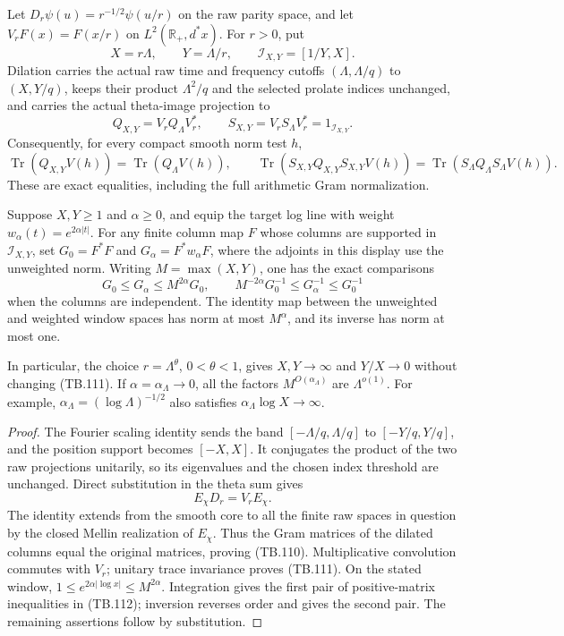 \begin{proposition}
Let \(D_r\psi(u)=r^{-1/2}\psi(u/r)\) on the raw parity
space, and let \(V_rF(x)=F(x/r)\) on
\(L^2(\mathbb R_+,d^*x)\).
For \(r>0\), put
\[
 X=r\Lambda,\qquad Y=\Lambda/r,\qquad
 \mathcal I_{X,Y}=[1/Y,X].
 \tag{TB.109}
\]
Dilation carries the actual raw time and frequency cutoffs
\((\Lambda,\Lambda/q)\) to \((X,Y/q)\), keeps their product
\(\Lambda^2/q\) and the selected prolate indices unchanged,
and carries the actual theta-image projection to
\[
 Q_{X,Y}=V_rQ_\Lambda V_r^*,\qquad
 S_{X,Y}=V_rS_\Lambda V_r^*
          =1_{\mathcal I_{X,Y}}.
 \tag{TB.110}
\]
Consequently, for every compact smooth norm test \(h\),
\[
 \operatorname{Tr}(Q_{X,Y}V(h))
       =\operatorname{Tr}(Q_\Lambda V(h)),\qquad
 \operatorname{Tr}(S_{X,Y}Q_{X,Y}S_{X,Y}V(h))
       =\operatorname{Tr}(S_\Lambda Q_\Lambda S_\Lambda V(h)).
 \tag{TB.111}
\]
These are exact equalities, including the full arithmetic
Gram normalization.

Suppose \(X,Y\geq1\) and \(\alpha\geq0\), and equip the target log line with
weight \(w_\alpha(t)=e^{2\alpha|t|}\).
For any finite column map \(F\) whose columns are supported
in \(\mathcal I_{X,Y}\), set
\(G_0=F^*F\) and \(G_\alpha=F^*w_\alpha F\), where the
adjoints in this display use the unweighted norm.
Writing \(M=\max(X,Y)\), one has the exact comparisons
\[
 G_0\leq G_\alpha\leq M^{2\alpha}G_0,\qquad
 M^{-2\alpha}G_0^{-1}\leq G_\alpha^{-1}\leq G_0^{-1}
 \tag{TB.112}
\]
when the columns are independent.
The identity map between the unweighted and weighted
window spaces has norm at most \(M^\alpha\), and its
inverse has norm at most one.

In particular, the choice \(r=\Lambda^\theta\),
\(0<\theta<1\), gives \(X,Y\to\infty\) and \(Y/X\to0\)
without changing (TB.111).
If \(\alpha=\alpha_\Lambda\to0\), all the factors
\(M^{O(\alpha_\Lambda)}\) are \(\Lambda^{o(1)}\).
For example, \(\alpha_\Lambda=(\log\Lambda)^{-1/2}\)
also satisfies \(\alpha_\Lambda\log X\to\infty\).
\end{proposition}
\begin{proof}
The Fourier scaling identity sends the band
\([-\Lambda/q,\Lambda/q]\) to \([-Y/q,Y/q]\), and
the position support becomes \([-X,X]\).
It conjugates the product of the two raw projections
unitarily, so its eigenvalues and the chosen index
threshold are unchanged.
Direct substitution in the theta sum gives
\[
 E_\chi D_r=V_rE_\chi.
 \tag{TB.113}
\]
The identity extends from the smooth core to all the
finite raw spaces in question by the closed Mellin
realization of \(E_\chi\).
Thus the Gram matrices of the dilated columns equal
the original matrices, proving (TB.110).
Multiplicative convolution commutes with \(V_r\);
unitary trace invariance proves (TB.111).
On the stated window,
\(1\leq e^{2\alpha|\log x|}\leq M^{2\alpha}\).
Integration gives the first pair of positive-matrix
inequalities in (TB.112); inversion reverses order and
gives the second pair.
The remaining assertions follow by substitution.
\end{proof}

